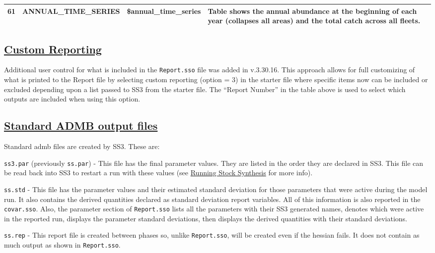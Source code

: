 \begin{landscape}
\begin{longtable}{p{1.5cm} p{5.5cm} >{\RaggedRight\arraybackslash}p{4.25cm} p{9.75cm}}
    61 & ANNUAL\_TIME\_SERIES & \$annual\_time\_series & Table shows the annual abundance at the beginning of each year (collapses all areas) and the total catch across all fleets. \\ 
    \hline
    \end{longtable}
\end{landscape}

\hypertarget{CustomReporting}{}
\subsection[Custom Reporting]{\protect\hyperlink{CustomReporting}{Custom Reporting}}
\hypertarget{custom}{} 
Additional user control for what is included in the \texttt{Report.sso} file was added in v.3.30.16. This approach allows for full customizing of what is printed to the Report file by selecting custom reporting (option = 3) in the starter file where specific items now can be included or excluded depending upon a list passed to SS3 from the starter file. The ``Report Number'' in the table above is used to select which outputs are included when using this option.

\hypertarget{ADMBOutput}{}
\subsection[Standard ADMB output files]{\protect\hyperlink{ADMBOutput}{Standard ADMB output files}}
Standard \gls{admb} files are created by SS3. These are:

\texttt{ss3.par} (previously \texttt{ss.par}) - This file has the final parameter values. They are listed in the order they are declared in SS3. This file can be read back into SS3 to restart a run with these values (see \hyperref[sec:RunningSS3]{Running Stock Synthesis} for more info).

\texttt{ss.std} - This file has the parameter values and their estimated standard deviation for those parameters that were active during the model run. It also contains the derived quantities declared as standard deviation report variables. All of this information is also reported in the \texttt{covar.sso}. Also, the parameter section of \texttt{Report.sso} lists all the parameters with their SS3 generated names, denotes which were active in the reported run, displays the parameter standard deviations, then displays the derived quantities with their standard deviations.

\texttt{ss.rep} - This report file is created between phases so, unlike \texttt{Report.sso}, will be created even if the hessian fails. It does not contain as much output as shown in \texttt{Report.sso}.

